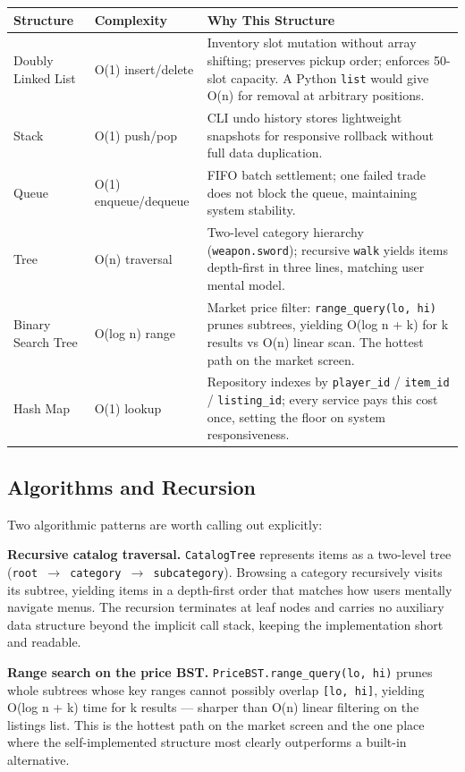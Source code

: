 \documentclass[11pt,a4paper]{article}
\begin{document}
\begin{table}[h]
\small
\begin{tabular}{p{2.8cm}p{1.8cm}p{8.5cm}}
\toprule
\textbf{Structure} & \textbf{Complexity} & \textbf{Why This Structure} \\
\midrule
Doubly Linked List & O(1) insert/delete & Inventory slot mutation without array shifting; preserves pickup order; enforces 50-slot capacity. A Python \texttt{list} would give O(n) for removal at arbitrary positions. \\
Stack & O(1) push/pop & CLI undo history stores lightweight snapshots for responsive rollback without full data duplication. \\
Queue & O(1) enqueue/dequeue & FIFO batch settlement; one failed trade does not block the queue, maintaining system stability. \\
Tree & O(n) traversal & Two-level category hierarchy (\texttt{weapon.sword}); recursive \texttt{walk} yields items depth-first in three lines, matching user mental model. \\
Binary Search Tree & O(log n) range & Market price filter: \texttt{range\_query(lo, hi)} prunes subtrees, yielding O(log n + k) for k results vs O(n) linear scan. The hottest path on the market screen. \\
Hash Map & O(1) lookup & Repository indexes by \texttt{player\_id} / \texttt{item\_id} / \texttt{listing\_id}; every service pays this cost once, setting the floor on system responsiveness. \\
\bottomrule
\end{tabular}
\end{table}

\subsection{Algorithms and Recursion}

Two algorithmic patterns are worth calling out explicitly:

\textbf{Recursive catalog traversal.} \texttt{CatalogTree} represents items as a two-level tree (\texttt{root \(\rightarrow\) category \(\rightarrow\) subcategory}). Browsing a category recursively visits its subtree, yielding items in a depth-first order that matches how users mentally navigate menus. The recursion terminates at leaf nodes and carries no auxiliary data structure beyond the implicit call stack, keeping the implementation short and readable.

\textbf{Range search on the price BST.} \texttt{PriceBST.range\_query(lo, hi)} prunes whole subtrees whose key ranges cannot possibly overlap \texttt{[lo, hi]}, yielding O(log n + k) time for k results — sharper than O(n) linear filtering on the listings list. This is the hottest path on the market screen and the one place where the self-implemented structure most clearly outperforms a built-in alternative.
\end{document}
